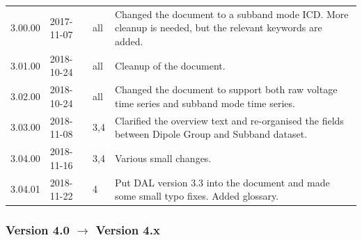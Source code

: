 \documentclass[a4paper,10pt,bibtotoc]{scrartcl}
\begin{document}
\begin{center}
  \tablelasttail{\hline}
  \begin{supertabular}{lllp{9.5cm}}
    3.00.00 & 2017-11-07 & all   & Changed the document to a subband mode ICD. 
       More cleanup is needed, but the relevant keywords are added. \\
    3.01.00 & 2018-10-24 & all   & Cleanup of the document. \\
    3.02.00 & 2018-10-24 & all   & Changed the document to support both raw voltage time series and subband mode time series. \\
    3.03.00 & 2018-11-08 & 3,4  & Clarified the overview text and re-organised the fields between Dipole Group and Subband dataset. \\
    3.04.00 & 2018-11-16 & 3,4  & Various small changes.\\
    3.04.01 & 2018-11-22 & 4  & Put DAL version 3.3 into the document and made some small typo fixes. Added glossary. \\
 \end{supertabular}
\end{center}


\subsubsection*{Version 4.0 $\rightarrow$ Version 4.x}
\end{document}
